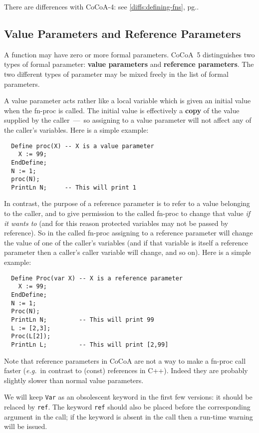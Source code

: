 \documentclass{book}[12,a4paper]
\def\eg{{\it e.g.}}
\def\refandpage#1{{\ref{#1}, pg.\pageref{#1}}}
\begin{document}
There are differences with CoCoA-4: see \refandpage{diffs:defining-fns}.


\subsection{Value Parameters and Reference Parameters}

A function may have zero or more formal parameters.  CoCoA~5 distinguishes
two types of formal parameter: \textbf{value parameters} and
\textbf{reference parameters}.  The two different types of parameter may be
mixed freely in the list of formal parameters.

A value parameter acts rather like a local variable which is given an
initial value when the fn-proc is called.  The initial value is effectively
a \textbf{copy} of the value supplied by the caller~---~so assigning to a
value parameter will not affect any of the caller's variables.  Here is a
simple example:
\begin{lstlisting}
  Define proc(X) -- X is a value parameter
    X := 99;
  EndDefine;
  N := 1;
  proc(N);
  PrintLn N;     -- This will print 1
\end{lstlisting}

In contrast, the purpose of a reference parameter is to refer to a value
belonging to the caller, and to give permission to the called fn-proc to
change that value \textit{if it wants to} (and for this reason protected variables
may not be passed by reference).  So in the called fn-proc assigning to a
reference parameter will change the value of one of the caller's variables
(and if that variable is itself a reference parameter then a caller's
caller variable will change, and so on).  Here is a simple example:
\begin{lstlisting}
  Define Proc(var X) -- X is a reference parameter
    X := 99;
  EndDefine;
  N := 1;
  Proc(N);
  PrintLn N;         -- This will print 99
  L := [2,3];
  Proc(L[2]);
  PrintLn L;         -- This will print [2,99]
\end{lstlisting}


 Note that reference parameters in CoCoA are not a way to make
a fn-proc call faster (\eg~in contrast to (const) references in C++).  Indeed they
are probably slightly slower than normal value parameters.

 We will keep \texttt{Var} as an obsolescent keyword in the first
few versions: it should be relaced by \texttt{ref}.  The keyword \texttt{ref}
should also be placed before the corresponding argument in the call; if the
keyword is absent in the call then a run-time warning will be issued.
\end{document}
